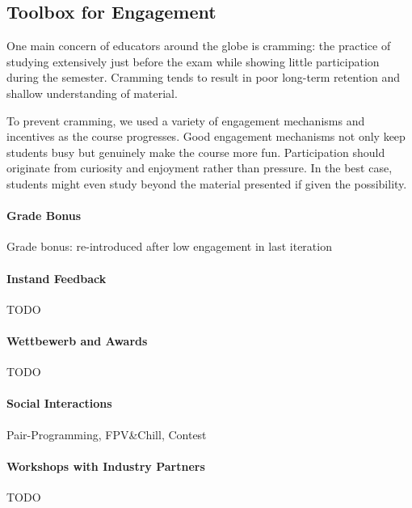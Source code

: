 \subsection{Toolbox for Engagement}

One main concern of educators around the globe is cramming:
the practice of studying extensively just before the exam while
showing little participation during the semester.
Cramming tends to result in poor long-term retention and shallow understanding
of material.

To prevent cramming,
we used a variety of engagement mechanisms and incentives as the course progresses.
Good engagement mechanisms not only keep students busy
but genuinely make the course more fun.
Participation should originate from curiosity and enjoyment rather than pressure.
In the best case, students might even study beyond the material presented
if given the possibility.

\paragraph{Grade Bonus}
Grade bonus: re-introduced after low engagement in last iteration

\paragraph{Instand Feedback}
TODO

\paragraph{Wettbewerb and Awards}
TODO

\paragraph{Social Interactions}
Pair-Programming, FPV\&Chill, Contest

\paragraph{Workshops with Industry Partners}
TODO

